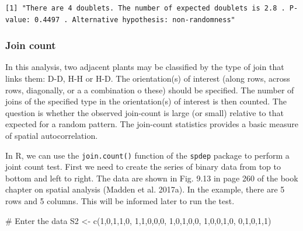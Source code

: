 \documentclass[
  letterpaper,
  DIV=11,
  numbers=noendperiod]{scrreprt}
\newenvironment{Shaded}{\begin{snugshade}}{\end{snugshade}}
\newcommand{\CommentTok}[1]{\textcolor[rgb]{0.37,0.37,0.37}{#1}}
\newcommand{\DecValTok}[1]{\textcolor[rgb]{0.68,0.00,0.00}{#1}}
\newcommand{\FunctionTok}[1]{\textcolor[rgb]{0.28,0.35,0.67}{#1}}
\newcommand{\NormalTok}[1]{\textcolor[rgb]{0.00,0.23,0.31}{#1}}
\newcommand{\OtherTok}[1]{\textcolor[rgb]{0.00,0.23,0.31}{#1}}
\newcommand{\SpecialCharTok}[1]{\textcolor[rgb]{0.37,0.37,0.37}{#1}}
\begin{document}
\begin{Shaded}
\end{Shaded}

\begin{verbatim}
[1] "There are 4 doublets. The number of expected doublets is 2.8 . P-value: 0.4497 . Alternative hypothesis: non-randomness"
\end{verbatim}

\hypertarget{join-count}{%
\subsubsection{Join count}\label{join-count}}

In this analysis, two adjacent plants may be classified by the type of
join that links them: D-D, H-H or H-D. The orientation(s) of interest
(along rows, across rows, diagonally, or a a combination o these) should
be specified. The number of joins of the specified type in the
orientation(s) of interest is then counted. The question is whether the
observed join-count is large (or small) relative to that expected for a
random pattern. The join-count statistics provides a basic measure of
spatial autocorrelation.

In R, we can use the \texttt{join.count()} function of the
\texttt{spdep} package to perform a joint count test. First we need to
create the series of binary data from top to bottom and left to right.
The data are shown in Fig. 9.13 in page 260 of the book chapter on
spatial analysis (Madden et al. 2017a). In the example, there are 5 rows
and 5 columns. This will be informed later to run the test.

\begin{Shaded}
\begin{Highlighting}[]
\CommentTok{\# Enter the data}
\NormalTok{S2 }\OtherTok{\textless{}{-}} \FunctionTok{c}\NormalTok{(}\DecValTok{1}\NormalTok{,}\DecValTok{0}\NormalTok{,}\DecValTok{1}\NormalTok{,}\DecValTok{1}\NormalTok{,}\DecValTok{0}\NormalTok{,}
       \DecValTok{1}\NormalTok{,}\DecValTok{1}\NormalTok{,}\DecValTok{0}\NormalTok{,}\DecValTok{0}\NormalTok{,}\DecValTok{0}\NormalTok{,}
       \DecValTok{1}\NormalTok{,}\DecValTok{0}\NormalTok{,}\DecValTok{1}\NormalTok{,}\DecValTok{0}\NormalTok{,}\DecValTok{0}\NormalTok{,}
       \DecValTok{1}\NormalTok{,}\DecValTok{0}\NormalTok{,}\DecValTok{0}\NormalTok{,}\DecValTok{1}\NormalTok{,}\DecValTok{0}\NormalTok{,}
       \DecValTok{0}\NormalTok{,}\DecValTok{1}\NormalTok{,}\DecValTok{0}\NormalTok{,}\DecValTok{1}\NormalTok{,}\DecValTok{1}\NormalTok{)}
\end{Highlighting}
\end{Shaded}
\end{document}
